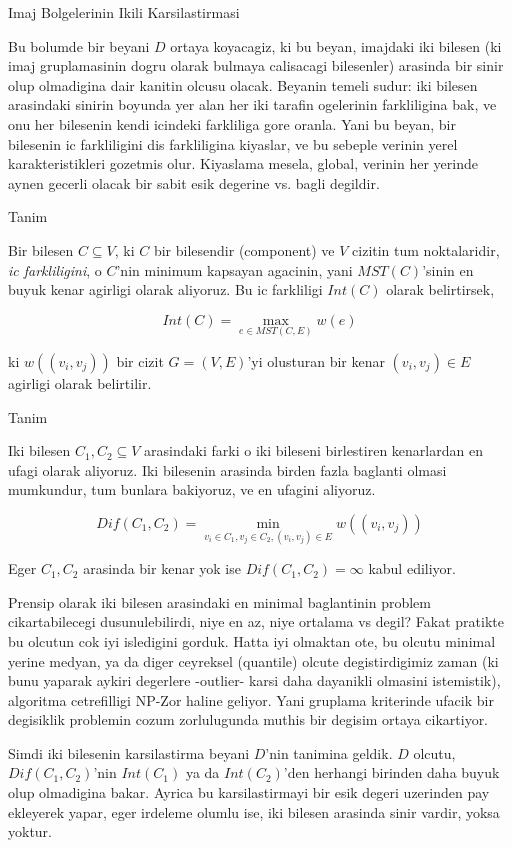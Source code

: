\documentclass[12pt,fleqn]{article}\usepackage{../common}
\begin{document}
Imaj Bolgelerinin Ikili Karsilastirmasi 

Bu bolumde bir beyani $D$ ortaya koyacagiz, ki bu beyan, imajdaki iki
bilesen (ki imaj gruplamasinin dogru olarak bulmaya calisacagi bilesenler)
arasinda bir sinir olup olmadigina dair kanitin olcusu olacak. Beyanin
temeli sudur: iki bilesen arasindaki sinirin boyunda yer alan her iki
tarafin ogelerinin farkliligina bak, ve onu her bilesenin kendi icindeki
farkliliga gore oranla. Yani bu beyan, bir bilesenin ic farkliligini dis
farkliligina kiyaslar, ve bu sebeple verinin yerel karakteristikleri
gozetmis olur. Kiyaslama mesela, global, verinin her yerinde aynen gecerli
olacak bir sabit esik degerine vs. bagli degildir.

Tanim

Bir bilesen $C \subseteq V$, ki $C$ bir bilesendir (component) ve $V$ cizitin tum
noktalaridir, {\em ic farkliligini}, o $C$'nin minimum kapsayan agacinin,
yani $MST(C)$'sinin en buyuk kenar agirligi olarak aliyoruz. Bu ic farkliligi
$Int(C)$ olarak belirtirsek, 

$$ Int(C) = \max_{e \in MST(C,E)} w(e) $$

ki $w((v_i , v_j))$ bir cizit $G = (V,E)$'yi olusturan bir kenar $(v_i,v_j)
\in E$ agirligi 
olarak belirtilir. 

Tanim

Iki bilesen $C_1,C_2 \subseteq V$ arasindaki farki o iki bileseni
birlestiren kenarlardan en ufagi olarak aliyoruz. Iki bilesenin arasinda
birden fazla baglanti olmasi mumkundur, tum bunlara bakiyoruz, ve en
ufagini aliyoruz.

$$ Dif(C_1,C_2) = \min_{v_i \in C_1, v_j \in C_2, (v_i,v_j) \in E} w((v_i,v_j))$$

Eger $C_1,C_2$ arasinda bir kenar yok ise $Dif(C_1,C_2) = \infty$ kabul
ediliyor. 

Prensip olarak iki bilesen arasindaki en minimal baglantinin problem
cikartabilecegi dusunulebilirdi, niye en az, niye ortalama vs degil? Fakat
pratikte bu olcutun cok iyi isledigini gorduk. Hatta iyi olmaktan ote, bu
olcutu minimal yerine medyan, ya da diger ceyreksel (quantile) olcute
degistirdigimiz zaman (ki bunu yaparak aykiri degerlere -outlier- karsi
daha dayanikli olmasini istemistik), algoritma cetrefilligi NP-Zor haline
geliyor. Yani gruplama kriterinde ufacik bir degisiklik problemin cozum
zorlulugunda muthis bir degisim ortaya cikartiyor. 

Simdi iki bilesenin karsilastirma beyani $D$'nin tanimina geldik. $D$ olcutu,
$Dif(C_1,C_2)$'nin $Int(C_1)$ ya da $Int(C_2)$'den herhangi birinden daha
buyuk olup olmadigina bakar. Ayrica bu karsilastirmayi bir esik degeri
uzerinden pay ekleyerek yapar, eger irdeleme olumlu ise, iki bilesen
arasinda sinir vardir, yoksa yoktur.
\end{document}

